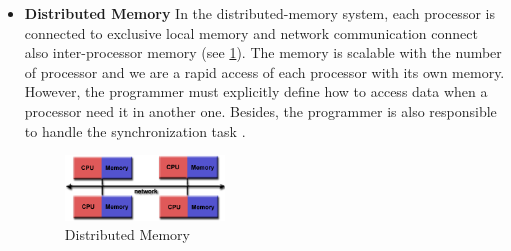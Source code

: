 \begin{itemize}
\item \textbf{Distributed Memory}
In the distributed-memory system, each processor is connected to exclusive local memory and network communication connect also inter-processor memory (see \ref{dmemory}). The memory is scalable with the number of processor and we are a rapid access of each processor with its own memory. However, the programmer must explicitly define how to access data when a processor need it in another one. Besides, the programmer is also responsible to handle the synchronization task \cite{}.
\begin{figure}[!h]
\centering 
\includegraphics[width=0.4\textwidth]{images/d-memory.png}
\caption{Distributed Memory}
\label{dmemory} 
\end{figure}


\end{itemize}
